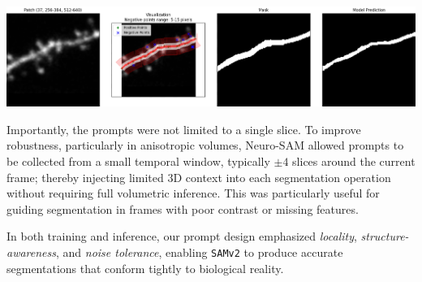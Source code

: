 \begin{center}
\includegraphics[width=1.0\textwidth]{figures/17_testing_prompts.png}
\label{fig:testing_prompts}
\end{center}

Importantly, the prompts were not limited to a single slice. To improve robustness, particularly in anisotropic volumes, Neuro-\gls{SAM} allowed prompts to be collected from a small temporal window, typically $\pm 4$ slices around the current frame; thereby injecting limited 3D context into each segmentation operation without requiring full volumetric inference. This was particularly useful for guiding segmentation in frames with poor contrast or missing features.

In both training and inference, our prompt design emphasized \textit{locality}, \textit{structure-awareness}, and \textit{noise tolerance}, enabling \texttt{\gls{SAMv2}} to produce accurate segmentations that conform tightly to biological reality.




